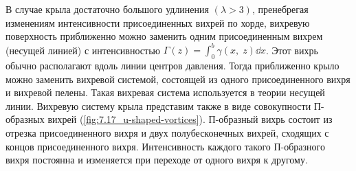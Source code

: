	В случае крыла достаточно большого удлинения $\left(\lambda>3\right)$, пренебрегая изменениям интенсивности присоединенных вихрей по хорде, вихревую поверхность приближенно можно заменить одним присоединенным вихрем (несущей линией) с интенсивностью $\Gamma\left(z\right)=\int_{0}^{b}\gamma\left(x,\;z\right)\dd x$. Этот вихрь обычно располагают вдоль линии центров давления. Тогда приближенно крыло можно заменить вихревой системой, состоящей из одного присоединенного вихря и вихревой пелены. Такая вихревая система используется в теории несущей линии. Вихревую систему крыла представим также в виде совокупности П-образных вихрей (\cref{fig:7.17_u-shaped-vortices}). П-образный вихрь состоит из отрезка присоединенного вихря и двух полубесконечных вихрей, сходящих с концов присоединенного вихря.\n
	Интенсивность каждого такого П-образного вихря постоянна и изменяется при переходе от одного вихря к другому.
	
